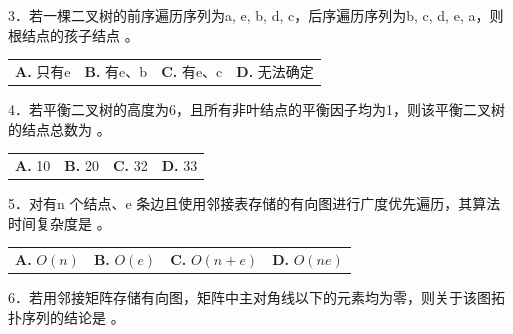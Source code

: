 \documentclass[UTF8,11pt]{ctexart}
\begin{document}
3．若一棵二叉树的前序遍历序列为a, e, b, d, c，后序遍历序列为b, c, d, e, a，则根结点的孩子结点 。


\begin{center}\begin{tabular}{>{\raggedright\arraybackslash}p{\dimexpr(\linewidth-8\tabcolsep)/4\relax}>{\raggedright\arraybackslash}p{\dimexpr(\linewidth-8\tabcolsep)/4\relax}>{\raggedright\arraybackslash}p{\dimexpr(\linewidth-8\tabcolsep)/4\relax}>{\raggedright\arraybackslash}p{\dimexpr(\linewidth-8\tabcolsep)/4\relax}}
\textbf{A.} 只有e & \textbf{B.} 有e、b & \textbf{C.} 有e、c & \textbf{D.} 无法确定\\[.35em]\end{tabular}\end{center}

4．若平衡二叉树的高度为6，且所有非叶结点的平衡因子均为1，则该平衡二叉树的结点总数为 。


\begin{center}\begin{tabular}{>{\raggedright\arraybackslash}p{\dimexpr(\linewidth-8\tabcolsep)/4\relax}>{\raggedright\arraybackslash}p{\dimexpr(\linewidth-8\tabcolsep)/4\relax}>{\raggedright\arraybackslash}p{\dimexpr(\linewidth-8\tabcolsep)/4\relax}>{\raggedright\arraybackslash}p{\dimexpr(\linewidth-8\tabcolsep)/4\relax}}
\textbf{A.} 10 & \textbf{B.} 20 & \textbf{C.} 32 & \textbf{D.} 33\\[.35em]\end{tabular}\end{center}

5．对有n 个结点、e 条边且使用邻接表存储的有向图进行广度优先遍历，其算法时间复杂度是 。


\begin{center}\begin{tabular}{>{\raggedright\arraybackslash}p{\dimexpr(\linewidth-8\tabcolsep)/4\relax}>{\raggedright\arraybackslash}p{\dimexpr(\linewidth-8\tabcolsep)/4\relax}>{\raggedright\arraybackslash}p{\dimexpr(\linewidth-8\tabcolsep)/4\relax}>{\raggedright\arraybackslash}p{\dimexpr(\linewidth-8\tabcolsep)/4\relax}}
\textbf{A.} \(\displaystyle O(n)\) & \textbf{B.} \(\displaystyle O(e)\) & \textbf{C.} \(\displaystyle O(n+e)\) & \textbf{D.} \(\displaystyle O(ne)\)\\[.35em]\end{tabular}\end{center}

6．若用邻接矩阵存储有向图，矩阵中主对角线以下的元素均为零，则关于该图拓扑序列的结论是 。
\end{document}
